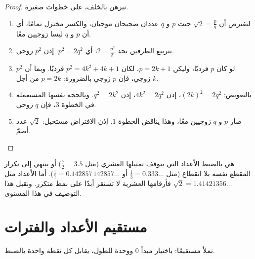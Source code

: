 \begin{proof}
نبرهن بالخلف، على خطوات صغيرة.
\begin{enumerate}
  \item لنفترض أن $\sqrt 2 = \frac{p}{q}$ حيث $p$ و $q$ عددان صحيحان
        موجبان، والكسر مختزل تمامًا، أي أن $p$ و $q$ ليسا زوجيين معًا.
  \item بتربيع الطرفين نجد $2 = \frac{p^2}{q^2}$، أي
        $p^2 = 2q^2$. إذن $p^2$ زوجي.
  \item لو كان $p$ فرديًا، وليكن $p = 2k+1$، لكان
        $p^2 = 4k^2 + 4k + 1$ فرديًا. وبما أن $p^2$ زوجي، فإن $p$
        زوجي بالضرورة: $p = 2k$ من أجل  $k$.
  \item بالتعويض: $(2k)^2 = 2q^2$، إذن $4k^2 = 2q^2$، إذن
        $q^2 = 2k^2$. وبالحجة نفسها المستعملة في الخطوة 3، فإن $q$ زوجي.
  \item صار $p$ و $q$ زوجيين معًا، وهذا يناقض الخطوة 1. إذن
        الافتراض مستحيل: $\sqrt 2$ عدد أصمّ.
\end{enumerate}
\end{proof}

\begin{remark}
 هي بالضبط الأعداد التي يتوقف تمثيلها العشري
(مثل $\frac72 = 3.5$) أو ينتهي إلى تكرار المقطع نفسه بلا انقطاع
(مثل $\frac13 = 0.333\dots$ أو $\frac{1}{7} = 0.142857\,142857\dots$).
أما الأعداد  مثل $\sqrt2 = 1.41421356\dots$ فأرقامها العشرية
لا تستقر أبدًا على نمط متكرر. ونقبل هذا التوصيف في هذا
المستوى.
\end{remark}

\section{مستقيم الأعداد والفترات}

تملأ  مستقيمًا: باختيار مبدأ $0$ ووحدة للطول، يقابل
كل  نقطة واحدة بالضبط.

